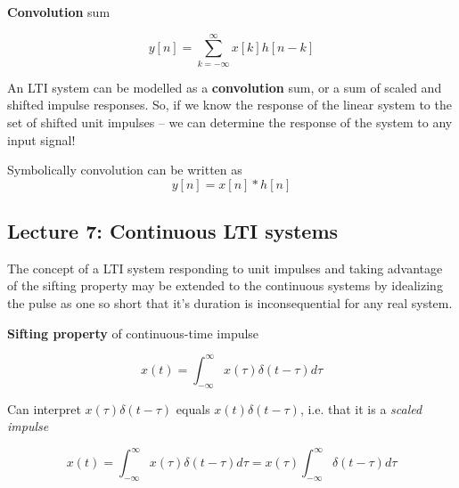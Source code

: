 \documentclass[../notes.tex]{subfiles}
\begin{document}
\begin{definition}
	\textbf{Convolution} sum 
	
	\begin{equation}
		y[n] = \sum_{k=-\infty}^{\infty} x[k] h[n-k]
	\end{equation}
	\begin{theorem}

		An LTI system can be modelled as a \textbf{convolution} sum, or a sum of scaled and shifted impulse responses.
		So, if we know the response of the linear system to the set of shifted unit impulses -- we can determine the response of the system to any input signal!

\end{theorem}

Symbolically convolution can be written as
\begin{equation}
	y[n] = x[n] * h[n]
\end{equation}


\end{definition}





\subsection{Lecture 7: Continuous LTI systems}

The concept of a LTI system responding to unit impulses and taking advantage of the sifting property may be extended to the continuous systems by idealizing the pulse as one so short that it's duration is inconsequential for any real system.

\begin{definition}
	\textbf{Sifting property} of continuous-time impulse

	\begin{equation}
		x(t) = \int_{-\infty}^{\infty} x(\tau) \delta(t-\tau) d\tau
	\end{equation}

	Can interpret $ x(\tau)\delta(t-\tau) $ equals $ x(t) \delta(t-\tau) $, i.e. that it is a \textit{scaled impulse} 

	\begin{equation}
		x(t) = \int_{-\infty}^{\infty} x(\tau) \delta(t-\tau) d\tau = x(\tau) \int_{-\infty}^{\infty} \delta(t-\tau)  d\tau
	\end{equation}
	
	
\end{definition}
\end{document}
